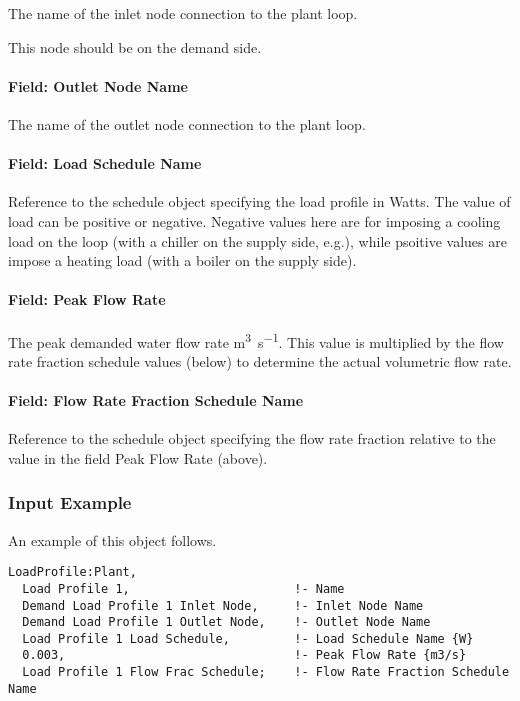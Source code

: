 The name of the inlet node connection to the plant loop.

This node should be on the demand side.

\paragraph{Field: Outlet Node Name}\label{field-outlet-node-name-003}

The name of the outlet node connection to the plant loop.

\paragraph{Field: Load Schedule Name}\label{field-load-schedule-name}

Reference to the schedule object specifying the load profile in Watts. The value of load can be positive or negative. Negative values here are for imposing a cooling load on the loop (with a chiller on the supply side, e.g.), while psoitive values are impose a heating load (with a boiler on the supply side).

\paragraph{Field: Peak Flow Rate}\label{field-peak-flow-rate}

The peak demanded water flow rate \si{\m\cubed\per\s}. This value is multiplied by the flow rate fraction schedule values (below) to determine the actual volumetric flow rate.

\paragraph{Field: Flow Rate Fraction Schedule Name}\label{field-flow-rate-fraction-schedule-name}

Reference to the schedule object specifying the flow rate fraction relative to the value in the field Peak Flow Rate (above).

\subsubsection{Input Example}

An example of this object follows.

\begin{lstlisting}
LoadProfile:Plant,
  Load Profile 1,                       !- Name
  Demand Load Profile 1 Inlet Node,     !- Inlet Node Name
  Demand Load Profile 1 Outlet Node,    !- Outlet Node Name
  Load Profile 1 Load Schedule,         !- Load Schedule Name {W}
  0.003,                                !- Peak Flow Rate {m3/s}
  Load Profile 1 Flow Frac Schedule;    !- Flow Rate Fraction Schedule Name
\end{lstlisting}

